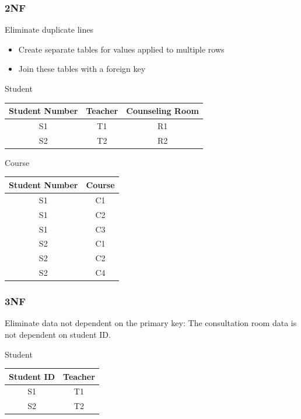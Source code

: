 \documentclass[11pt,journal,compsoc]{IEEEtran}
\begin{document}
\subsubsection{2NF}

Eliminate duplicate lines

\begin{itemize}
    \item Create separate tables for values applied to multiple rows
    \item Join these tables with a foreign key
\end{itemize}

Student

\begin{table}[H]
    \centering
    \begin{tabular}{|c|c|c|}
        \hline
        Student Number & Teacher & Counseling Room \\
        \hline
        S1 & T1 & R1 \\
        \hline
        S2 & T2 & R2 \\
        \hline
    \end{tabular}
\end{table}

Course

\begin{table}[H]
    \centering
    \begin{tabular}{|c|c|}
        \hline
        Student Number & Course \\
        \hline
        S1 & C1 \\
        \hline
        S1 & C2 \\
        \hline
        S1 & C3 \\
        \hline
        S2 & C1 \\
        \hline
        S2 & C2 \\
        \hline
        S2 & C4 \\
        \hline
    \end{tabular}
\end{table}


\subsubsection{3NF}

Eliminate data not dependent on the primary key: The consultation room data is not dependent on student ID.

Student

\begin{table}[H]
    \centering
    \begin{tabular}{|c|c|}
        \hline
        Student ID & Teacher \\
        \hline
        S1 & T1 \\
        S2 & T2 \\
        \hline
    \end{tabular}
\end{table}
\end{document}
